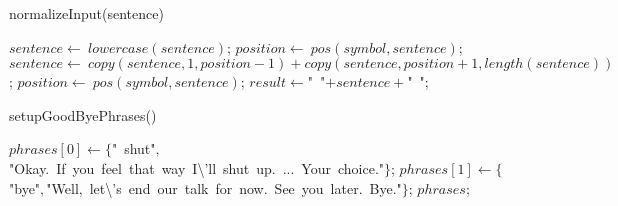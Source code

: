 \documentclass[a4paper,10pt]{article}
\begin{document}
\begin{algorithm}
\caption{normalizeInput(sentence)}
\begin{algorithmic}[5]

\STATE {}
\STATE {}
\STATE {}
  \STATE \(sentence\gets\ lowercase(sentence)\);
    \STATE \(position\gets\ pos(symbol,sentence)\);
      \STATE \(sentence\gets\ copy(sentence,1,position-1)+copy(sentence,position+1,length(sentence))\);
      \STATE \(position\gets\ pos(symbol,sentence)\);
    \ENDWHILE
  \ENDFOR
  \STATE \(result\gets\)"{}\ "{}\(+sentence+\)"{}\ "{}\(\);

\end{algorithmic}
\end{algorithm}


\begin{algorithm}
\caption{setupGoodByePhrases()}
\begin{algorithmic}[5]

  \STATE \(phrases[0]\gets\{\)"{}\ shut"{}\(,\)"{}Okay.\ If\ you\ feel\ that\ way\ I\textbackslash{}'{}ll\ shut\ up.\ ...\ Your\ choice."{}\(\}\);
  \STATE \(phrases[1]\gets\{\)"{}bye"{}\(,\)"{}Well,\ let\textbackslash{}'{}s\ end\ our\ talk\ for\ now.\ See\ you\ later.\ Bye."{}\(\}\);
  \RETURN\(phrases\);

\end{algorithmic}
\end{algorithm}
\end{document}
